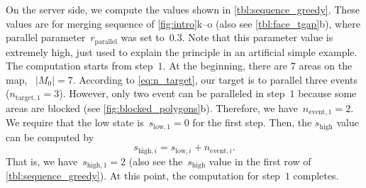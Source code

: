 \documentclass[]{interact}
\begin{document}
On the server side, 
we compute the values shown in \tabl\ref{tbl:sequence_greedy}.
These values are for merging sequence of \fig\ref{fig:intro}k--o 
(also see \tabl\ref{tbl:face_tgap}b),
where parallel parameter~$r_\mathrm{parallel}$ was set to~$0.3$.
Note that this parameter value is extremely high, 
just used to explain the principle in an artificial simple example.
The computation starts from step~$1$.
At the beginning, there are $7$ areas on the map, \ie~$|M_0| = 7$.
According to \eq\ref{eq:n_target},
our target is to parallel three events ($n_{\mathrm{target},1} = 3$).
However, only two event can be paralleled in step~$1$ 
because some areas are blocked
(see \fig\ref{fig:blocked_polygons}b).
Therefore, we have~$n_{\mathrm{event},1} = 2$.
We require that the low state is~$s_{\mathrm{low},1} = 0$ for the first step.
Then, the $s_\mathrm{high}$ value can be computed by
\begin{equation}
\label{eq:state_high}
s_{\mathrm{high},i} = s_{\mathrm{low},i} + n_{\mathrm{event},i}.
\end{equation}
That is, we have~$s_{\mathrm{high},1}=2$
(also see the~$s_\mathrm{high}$ value in the first row of \tabl\ref{tbl:sequence_greedy}).
At this point, the computation for step~$1$ completes.
\end{document}
